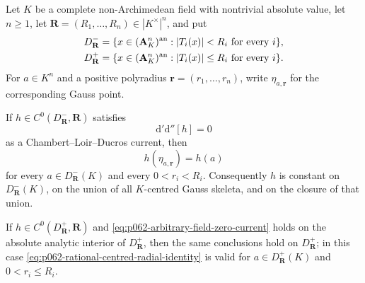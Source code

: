 
\begin{proposition}\label{prop:p062-rational-centred-traces}
Let \(K\) be a complete non-Archimedean field with nontrivial absolute
value, let \(n\geq 1\), let
\(\mathbf R=(R_1,\ldots,R_n)\in |K^\times|^n\), and put
\[
 \begin{aligned}
 D^-_{\mathbf R}
  &=\{x\in(\mathbf A^n_K)^{\mathrm{an}}:|T_i(x)|<R_i
                       \text{ for every }i\},\\
 D^+_{\mathbf R}
  &=\{x\in(\mathbf A^n_K)^{\mathrm{an}}:|T_i(x)|\leq R_i
                       \text{ for every }i\}.
 \end{aligned}
\]
For \(a\in K^n\) and a positive polyradius
\(\mathbf r=(r_1,\ldots,r_n)\), write
\(\eta_{a,\mathbf r}\) for the corresponding Gauss point.

If \(h\in C^0(D^-_{\mathbf R},\mathbf R)\) satisfies
\begin{equation}\label{eq:p062-arbitrary-field-zero-current}
                       \mathrm d'\mathrm d''[h]=0
\end{equation}
as a Chambert--Loir--Ducros current, then
\begin{equation}\label{eq:p062-rational-centred-radial-identity}
                         h(\eta_{a,\mathbf r})=h(a)
\end{equation}
for every \(a\in D^-_{\mathbf R}(K)\) and every
\(0<r_i<R_i\).  Consequently \(h\) is constant on
\(D^-_{\mathbf R}(K)\), on the union of all \(K\)-centred Gauss
skeleta, and on the closure of that union.

If \(h\in C^0(D^+_{\mathbf R},\mathbf R)\) and
\eqref{eq:p062-arbitrary-field-zero-current} holds on the absolute
analytic interior of \(D^+_{\mathbf R}\), then the same conclusions hold
on \(D^+_{\mathbf R}\); in this case
\eqref{eq:p062-rational-centred-radial-identity} is valid for
\(a\in D^+_{\mathbf R}(K)\) and \(0<r_i\leq R_i\).
\end{proposition}

